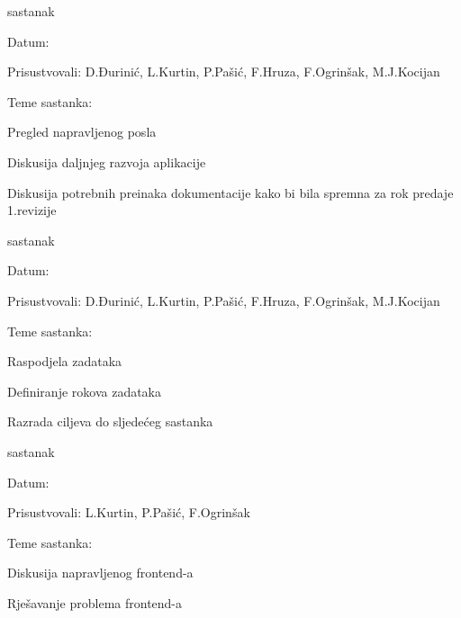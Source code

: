 \begin{packed_enum}
		\item  sastanak
		\item[] \begin{packed_item}
			\item Datum: \trecisastanak
			\item Prisustvovali: D.Đurinić, L.Kurtin, P.Pašić, F.Hruza, F.Ogrinšak, M.J.Kocijan
			\item Teme sastanka:
			\begin{packed_item}
				\item  Pregled napravljenog posla
				\item  Diskusija daljnjeg razvoja aplikacije
				\item  Diskusija potrebnih preinaka dokumentacije kako bi bila spremna za rok predaje 1.revizije
			\end{packed_item}
		\end{packed_item}
	
	\item  sastanak
	\item[] \begin{packed_item}
		\item Datum: \cetvrtisastanak
		\item Prisustvovali: D.Đurinić, L.Kurtin, P.Pašić, F.Hruza, F.Ogrinšak, M.J.Kocijan
		\item Teme sastanka:
		\begin{packed_item}
			\item  Raspodjela zadataka 
			\item  Definiranje rokova zadataka
			\item  Razrada ciljeva do sljedećeg sastanka
		\end{packed_item}
	\end{packed_item}

	\item  sastanak
	\item[] \begin{packed_item}
		\item Datum: \petisastanak
		\item Prisustvovali: L.Kurtin, P.Pašić, F.Ogrinšak
		\item Teme sastanka:
		\begin{packed_item}
			\item  Diskusija napravljenog frontend-a
			\item  Rješavanje problema frontend-a
		\end{packed_item}
	\end{packed_item}


\end{packed_enum}
